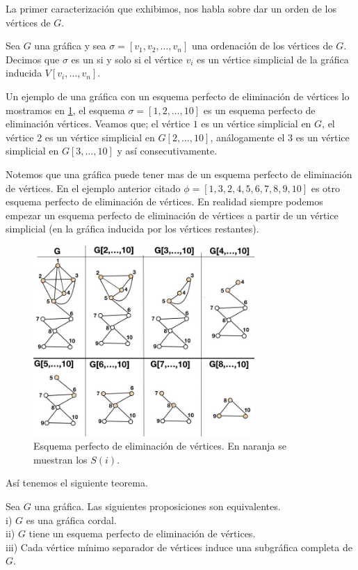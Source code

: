 La primer caracterización que exhibimos, nos habla sobre dar un orden de los vértices de $G$.

Sea $G$ una gráfica y sea $\sigma= [v_1,v_2, \dots, v_n]$ una ordenación de los vértices de $G$. Decimos que $\sigma$ es un  si y solo si el vértice $v_i$ es un vértice simplicial de la gráfica inducida $V[v_{i}, \dots , v_n]$.

Un ejemplo de una gráfica con un esquema perfecto de eliminación de vértices lo mostramos en \cref{fig:16}, el esquema $\sigma=[1,2,\dots, 10]$ es un esquema perfecto de eliminación vértices. Veamos que; el vértice $1$ es un vértice simplicial en $G$, el vértice $2$ es un vértice simplicial en $G[2, \dots, 10]$, análogamente el $3$ es un vértice simplicial en $G[3, \dots, 10]$ y así consecutivamente. 

Notemos que una gráfica puede tener mas de un esquema perfecto de eliminación de vértices. En el ejemplo anterior citado $\phi = [1,3,2,4,5,6,7,8,9,10]$ es otro esquema perfecto de eliminación de vértices. En realidad siempre podemos empezar un esquema perfecto de eliminación de vértices a partir de un vértice simplicial (en la gráfica inducida por los vértices restantes).

\begin{figure}[H]
  \centering
  \includegraphics[width=0.75\textwidth]{recursos/capturas/19.jpg}
  \caption{Esquema perfecto de eliminación de vértices. En naranja se muestran los $S(i)$.}
  \label{fig:16}
\end{figure}

Así tenemos el siguiente teorema. 

\begin{teorema}
\label{teo:102}
    Sea $G$ una gráfica. Las siguientes proposiciones son equivalentes.\\
    i) $G$ es una gráfica cordal.\\
    ii) $G$ tiene un esquema perfecto de eliminación de vértices.\\
    iii) Cada vértice mínimo separador de vértices induce una subgráfica completa de $G$.
\end{teorema}

